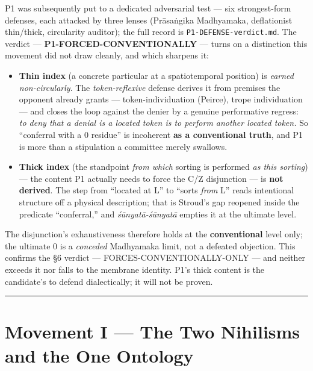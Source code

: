\documentclass[11pt]{article}
\begin{document}
P1 was subsequently put to a dedicated adversarial test — six strongest-form defenses, each attacked by three lenses (Prāsaṅgika Madhyamaka, deflationist thin/\allowbreak{}thick, circularity auditor); the full record is \texttt{P1-DEFENSE-verdict.md}. The verdict — \textbf{P1-FORCED-CONVENTIONALLY} — turns on a distinction this movement did not draw cleanly, and which sharpens it:

\begin{itemize}
\item \textbf{Thin index} (a concrete particular at a spatiotemporal position) is \emph{earned non-circularly}. The \emph{token-reflexive} defense derives it from premises the opponent already grants — token-individuation (Peirce), trope individuation — and closes the loop against the denier by a genuine performative regress: \emph{to deny that a denial is a located token is to perform another located token.} So ``conferral with a 0 residue'' is incoherent \textbf{as a conventional truth}, and P1 is more than a stipulation a committee merely swallows.
\item \textbf{Thick index} (the standpoint \emph{from which} sorting is performed \emph{as this sorting}) — the content P1 actually needs to force the C/\allowbreak{}Z disjunction — is \textbf{not derived}. The step from ``located at L'' to ``sorts \emph{from} L'' reads intentional structure off a physical description; that is Stroud's gap reopened inside the predicate ``conferral,'' and \emph{śūnyatā-śūnyatā} empties it at the ultimate level.
\end{itemize}

The disjunction's exhaustiveness therefore holds at the \textbf{conventional} level only; the ultimate 0 is a \emph{conceded} Madhyamaka limit, not a defeated objection. This confirms the §6 verdict — FORCES-CONVENTIONALLY-ONLY — and neither exceeds it nor falls to the membrane identity. P1's thick content is the candidate's to defend dialectically; it will not be proven.

\medskip\noindent\rule{\linewidth}{0.3pt}\medskip

\section*{Movement I — The Two Nihilisms and the One Ontology}
\end{document}

